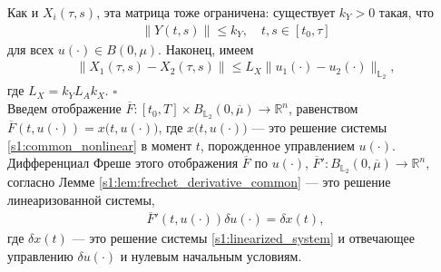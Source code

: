 \documentclass[../main.tex]{subfiles}
\begin{document}
Как и $X_i(\tau,s)$, эта матрица тоже ограничена: существует $k_Y>0$ такая, что
\begin{gather*}
    \|Y(t,s)\| \leqslant k_Y, \quad t,s \in [t_0, \tau]
\end{gather*}
для всех $u(\cdot) \in B(0,\mu)$.
Наконец, имеем 
\begin{gather*}
    \| X_1(\tau,s) - X_2(\tau,s) \| \leqslant L_X \| u_1(\cdot) - u_2(\cdot) \|_{\mathbb{L}_2}, 
\end{gather*} 
где $ L_X = k_Y L_A k_X$.
\hfill$\square$\\[1ex]%
Введем отображение $\overline{F}: [t_0,T]  \times B_{\mathbb{L}_2}(0,\overline{\mu}) \to \mathbb{R}^n$, равенством $\overline{F}(t, u(\cdot)) = x \big(t, u(\cdot)\big) $, где $x \big(t, u(\cdot)\big)$ --- это решение системы \eqref{s1:common_nonlinear} в момент $t$, порожденное управлением $u(\cdot)$.
Дифференциал Фреше этого отображения $\overline{F}$ по $u(\cdot)$, $\overline{F}': B_{\mathbb{L}_2}(0,\overline{\mu}) \to \mathbb{R}^n $, согласно Лемме \ref{s1:lem:frechet_derivative_common} --- это решение линеаризованной системы, 
\begin{gather}\label{s1:diff_of_mapping_F}
    \overline{F}'(t, u(\cdot)) \delta u(\cdot) = \delta x(t), 
\end{gather}
где $\delta x(t)$ --- это решение системы \eqref{s1:linearized_system} и отвечающее управлению $\delta u(\cdot)$ и нулевым начальным условиям.
    
\end{document}
